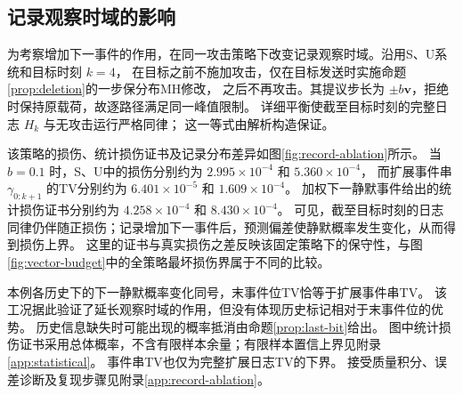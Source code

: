 \subsection{记录观察时域的影响}
\label{sec:record-ablation}
为考察增加下一事件的作用，在同一攻击策略下改变记录观察时域。沿用S、U系统和目标时刻 $k=4$，
在目标之前不施加攻击，仅在目标发送时实施命题\ref{prop:deletion}的一步保分布MH修改，
之后不再攻击。其提议步长为 $\pm b{\bm{v}}$，拒绝时保持原载荷，故逐路径满足同一峰值限制。
详细平衡使截至目标时刻的完整日志 $H_k$ 与无攻击运行严格同律；
这一等式由解析构造保证。

该策略的损伤、统计损伤证书及记录分布差异如图\ref{fig:record-ablation}所示。
当 $b=0.1$ 时，S、U中的损伤分别约为 $2.995\times10^{-4}$ 和 $5.360\times10^{-4}$，
而扩展事件串 $\gamma_{0:k+1}$ 的TV分别约为 $6.401\times10^{-5}$ 和 $1.609\times10^{-4}$。
加权下一静默事件给出的统计损伤证书分别约为 $4.258\times10^{-4}$ 和 $8.430\times10^{-4}$。
可见，截至目标时刻的日志同律仍伴随正损伤；记录增加下一事件后，预测偏差使静默概率发生变化，从而得到损伤上界。
这里的证书与真实损伤之差反映该固定策略下的保守性，与图\ref{fig:vector-budget}中的全策略最坏损伤界属于不同的比较。

本例各历史下的下一静默概率变化同号，末事件位TV恰等于扩展事件串TV。
该工况据此验证了延长观察时域的作用，但没有体现历史标记相对于末事件位的优势。
历史信息缺失时可能出现的概率抵消由命题\ref{prop:last-bit}给出。
图中统计损伤证书采用总体概率，不含有限样本余量；有限样本置信上界见附录\ref{app:statistical}。
事件串TV也仅为完整扩展日志TV的下界。
接受质量积分、误差诊断及复现步骤见附录\ref{app:record-ablation}。


